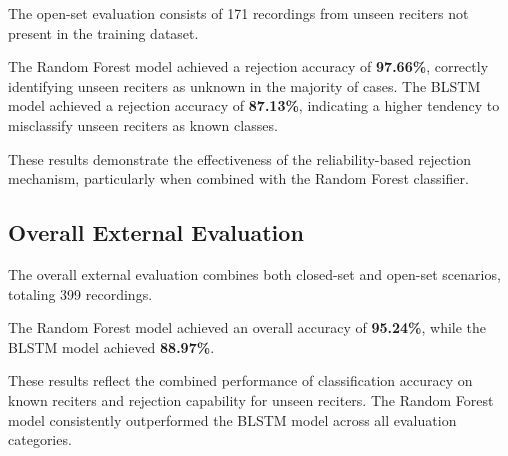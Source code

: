 \documentclass[conference]{IEEEtran}
\begin{document}
The open-set evaluation consists of 171 recordings from unseen reciters not present in the training dataset.

The Random Forest model achieved a rejection accuracy of \textbf{97.66\%}, correctly identifying unseen reciters as unknown in the majority of cases. The BLSTM model achieved a rejection accuracy of \textbf{87.13\%}, indicating a higher tendency to misclassify unseen reciters as known classes.

These results demonstrate the effectiveness of the reliability-based rejection mechanism, particularly when combined with the Random Forest classifier.

\subsection{Overall External Evaluation}

The overall external evaluation combines both closed-set and open-set scenarios, totaling 399 recordings.

The Random Forest model achieved an overall accuracy of \textbf{95.24\%}, while the BLSTM model achieved \textbf{88.97\%}.

These results reflect the combined performance of classification accuracy on known reciters and rejection capability for unseen reciters. The Random Forest model consistently outperformed the BLSTM model across all evaluation categories.

\begin{table}[t]
\centering
\caption{Summary of evaluation results across all experimental settings.}
\label{table3}
\renewcommand{\arraystretch}{1.2}
\setlength{\tabcolsep}{6pt}
\end{table}
\end{document}
